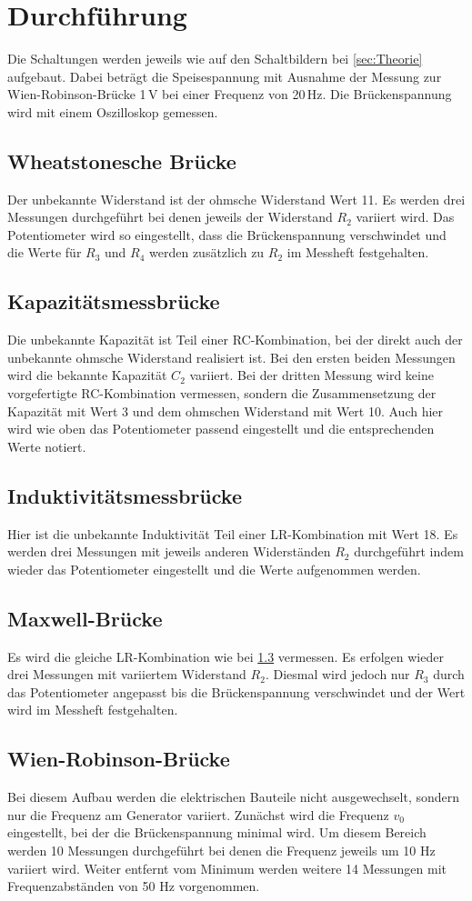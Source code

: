 \section{Durchführung}
\label{sec:Durchführung}

Die Schaltungen werden jeweils wie auf den Schaltbildern bei 
\ref{sec:Theorie} aufgebaut. Dabei beträgt die
Speisespannung mit Ausnahme der Messung
zur Wien-Robinson-Brücke 1\,V bei einer Frequenz von 20\,Hz. Die Brückenspannung wird
mit einem Oszilloskop gemessen.
\subsection{Wheatstonesche Brücke}
Der unbekannte Widerstand ist der ohmsche Widerstand Wert 11.
Es werden drei Messungen durchgeführt bei denen jeweils der Widerstand $R_2$
variiert wird. Das Potentiometer wird so eingestellt,
dass die Brückenspannung verschwindet und die Werte
für $R_3$ und $R_4$ werden zusätzlich zu $R_2$ im Messheft festgehalten.
\subsection{Kapazitätsmessbrücke}
Die unbekannte Kapazität ist Teil einer RC-Kombination,
bei der direkt auch der unbekannte ohmsche Widerstand realisiert ist.
Bei den ersten beiden Messungen wird die bekannte Kapazität $C_2$ variiert.
Bei der dritten Messung wird keine vorgefertigte RC-Kombination vermessen, sondern die 
Zusammensetzung der Kapazität mit Wert 3 und dem ohmschen Widerstand mit Wert 10.
Auch hier wird wie oben das Potentiometer passend eingestellt und die
entsprechenden Werte notiert.
\subsection{Induktivitätsmessbrücke}
\label{sec:Indu}
Hier ist die unbekannte Induktivität Teil einer LR-Kombination
mit Wert 18. Es werden drei Messungen mit jeweils anderen Widerständen $R_2$
durchgeführt indem wieder das Potentiometer eingestellt und die Werte aufgenommen werden.
\subsection{Maxwell-Brücke}
Es wird die gleiche LR-Kombination wie bei \ref{sec:Indu} vermessen.
Es erfolgen wieder drei Messungen mit variiertem Widerstand $R_2$. Diesmal
wird jedoch nur $R_3$ durch das Potentiometer angepasst bis die
Brückenspannung verschwindet und der Wert wird im Messheft festgehalten.

\subsection{Wien-Robinson-Brücke}
Bei diesem Aufbau werden die elektrischen Bauteile
nicht ausgewechselt, sondern nur die Frequenz am 
Generator variiert. Zunächst wird die Frequenz $v_0$ eingestellt,
bei der die Brückenspannung minimal wird. Um diesem Bereich werden
10 Messungen durchgeführt bei denen die Frequenz jeweils um 10 Hz
variiert wird. Weiter entfernt vom Minimum werden weitere 14 Messungen
mit Frequenzabständen von 50 Hz vorgenommen.

